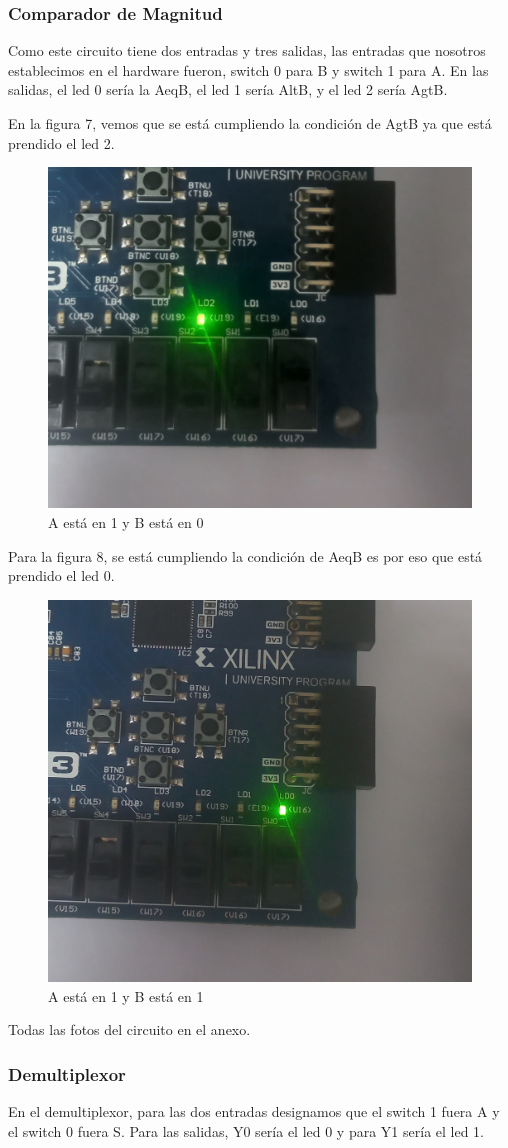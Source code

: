 \documentclass[12pt]{article}  %
\begin{document}
\subsubsection*{Comparador de Magnitud}

Como este circuito tiene dos entradas y tres salidas, las entradas que nosotros establecimos en el hardware fueron, switch 0 para B y switch 1 para A. En las salidas, el led 0 sería la AeqB, el led 1 sería AltB, y el led 2 sería AgtB.

En la figura 7, vemos que se está cumpliendo la condición de AgtB ya que está prendido el led 2.
\newpage
\begin{figure}[!ht]
    \centering
    \caption{A está en 1 y  B está en 0}
    \includegraphics[width=0.4\linewidth]{simulations/magnitud-comp/comp-mag-10.jpg}
\end{figure}

Para la figura 8, se está cumpliendo la condición de AeqB es por eso que está prendido el led 0.
\begin{figure}[!ht]
    \centering
    \caption{A está en 1 y B está en 1}
    \includegraphics[width=0.4\linewidth]{simulations/magnitud-comp/comp.mag-11.jpg}
\end{figure}

Todas las fotos del circuito en el anexo.

\subsubsection*{Demultiplexor}
En el demultiplexor, para las dos entradas designamos que el switch 1 fuera A y el switch 0 fuera S. Para las salidas, Y0 sería el led 0 y para Y1 sería el led 1.
\end{document}
